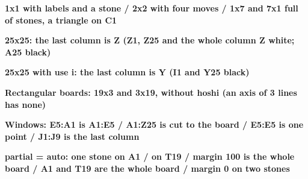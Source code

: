 \documentclass{article}
\newcommand\case[1]{\par\medskip\noindent\textbf{#1}\par\nopagebreak}
\begin{document}
\case{1x1 with labels and a stone / 2x2 with four moves / 1x7 and 7x1 full of stones, a triangle on C1}
\begin{goban}[1, label = {at = all}]\end{goban}
\begin{goban}[2]\end{goban}
\begin{goban}[1x7, scale = 0.6]\end{goban}
\begin{goban}[7x1, scale = 0.6]\end{goban}

\case{25x25: the last column is Z (Z1, Z25 and the whole column Z white; A25 black)}
\begin{goban}[25, scale = 0.4, label = {at = all}]\end{goban}

\case{25x25 with use i: the last column is Y (I1 and Y25 black)}
\begin{goban}[25, use i, scale = 0.4, label = {at = all}]\end{goban}

\case{Rectangular boards: 19x3 and 3x19, without hoshi (an axis of 3 lines has none)}
\begin{goban}[19x3, scale = 0.5]\end{goban}
\begin{goban}[3x19, scale = 0.5]\end{goban}

\case{Windows: E5:A1 is A1:E5 / A1:Z25 is cut to the board / E5:E5 is one point / J1:J9 is the last column}
\begin{goban}[9, partial = E5:A1, label = {at = all}]\end{goban}
\begin{goban}[9, partial = A1:Z25, scale = 0.5]\end{goban}
\begin{goban}[9, partial = E5:E5, label = {at = all}]\end{goban}
\begin{goban}[9, partial = J1:J9, label = {at = all}]\end{goban}

\case{partial = auto: one stone on A1 / on T19 / margin 100 is the whole board / A1 and T19 are the whole board / margin 0 on two stones}
\begin{goban}[19, partial = auto, scale = 0.5]\end{goban}
\begin{goban}[19, partial = auto, scale = 0.5]\end{goban}
\begin{goban}[19, partial = auto, partial margin = 100, scale = 0.3]\end{goban}
\begin{goban}[19, partial = auto, scale = 0.3]\end{goban}
\begin{goban}[19, partial = auto, partial margin = 0, scale = 0.5]\end{goban}
\end{document}
